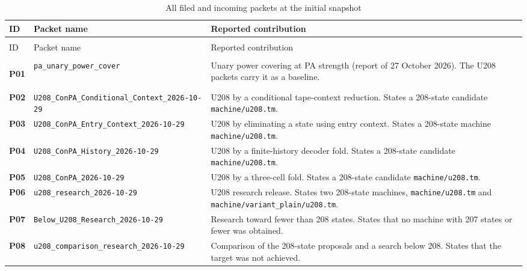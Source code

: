 \begin{longtable}{@{}>{\raggedright\arraybackslash}p{.055\linewidth}>{\raggedright\arraybackslash}p{.355\linewidth}>{\raggedright\arraybackslash}p{.55\linewidth}@{}}
\caption{All filed and incoming packets at the initial snapshot}\label{tab:packet-ledger}\\
\toprule
ID & Packet name & Reported contribution\\
\midrule
\endfirsthead
\multicolumn{3}{@{}l}{\textit{Table \thetable\ continued}}\\
\toprule
ID & Packet name & Reported contribution\\
\midrule
\endhead
\midrule
\multicolumn{3}{r@{}}{\textit{Continued on the next page}}\\
\endfoot
\bottomrule
\endlastfoot
\hypertarget{packet-P01}{\textbf{P01}} & \nolinkurl{pa_unary_power_cover} & Unary power covering at PA strength (report of 27 October 2026). The U208 packets carry it as a baseline.\\[3pt]
\hypertarget{packet-P02}{\textbf{P02}} & \nolinkurl{U208_ConPA_Conditional_Context_2026-10-29} & U208 by a conditional tape-context reduction. States a 208-state candidate \nolinkurl{machine/u208.tm}.\\[3pt]
\hypertarget{packet-P03}{\textbf{P03}} & \nolinkurl{U208_ConPA_Entry_Context_2026-10-29} & U208 by eliminating a state using entry context. States a 208-state machine \nolinkurl{machine/u208.tm}.\\[3pt]
\hypertarget{packet-P04}{\textbf{P04}} & \nolinkurl{U208_ConPA_History_2026-10-29} & U208 by a finite-history decoder fold. States a 208-state candidate \nolinkurl{machine/u208.tm}.\\[3pt]
\hypertarget{packet-P05}{\textbf{P05}} & \nolinkurl{U208_ConPA_2026-10-29} & U208 by a three-cell fold. States a 208-state candidate \nolinkurl{machine/u208.tm}.\\[3pt]
\hypertarget{packet-P06}{\textbf{P06}} & \nolinkurl{u208_research_2026-10-29} & U208 research release. States two 208-state machines, \nolinkurl{machine/u208.tm} and \nolinkurl{machine/variant_plain/u208.tm}.\\[3pt]
\hypertarget{packet-P07}{\textbf{P07}} & \nolinkurl{Below_U208_Research_2026-10-29} & Research toward fewer than 208 states. States that no machine with 207 states or fewer was obtained.\\[3pt]
\hypertarget{packet-P08}{\textbf{P08}} & \nolinkurl{u208_comparison_research_2026-10-29} & Comparison of the 208-state proposals and a search below 208. States that the target was not achieved.\\[3pt]

\end{longtable}
